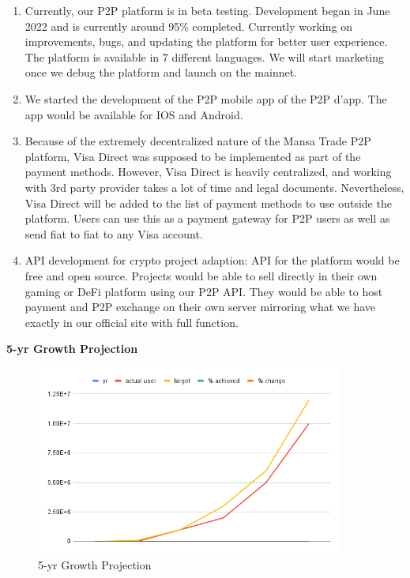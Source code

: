 \documentclass{article}
\begin{document}
\begin{enumerate}
    \item Currently, our P2P platform is in beta testing. Development began in June 2022 and is currently around 95\% completed. Currently working on improvements, bugs, and updating the platform for better user experience. The platform is available in 7 different languages. We will start marketing once we debug the platform and launch on the mainnet.
    \item We started the development of the P2P mobile app of the P2P d'app. The app would be available for IOS and Android.
    \item Because of the extremely decentralized nature of the Mansa Trade P2P platform, Visa Direct was supposed to be implemented as part of the payment methods. However, Visa Direct is heavily centralized, and working with 3rd party provider takes a lot of time and legal documents. Nevertheless, Visa Direct will be added to the list of payment methods to use outside the platform. Users can use this as a payment gateway for P2P users as well as send fiat to fiat to any Visa account.
    \item API development for crypto project adaption: API for the platform would be free and open source. Projects would be able to sell directly in their own gaming or DeFi platform using our P2P API. They would be able to host payment and P2P exchange on their own server mirroring what we have exactly in our official site with full function.
\end{enumerate}

\textbf{5-yr Growth Projection}

\begin{figure}[h]
  \begin{center}
    \centering
    \includegraphics[width=0.9\textwidth]{fig/5y-grow-projection.png}
    \caption[Fig 2]{5-yr Growth Projection\label{fig:poh_insert}}
  \end{center}
\end{figure}
\end{document}

